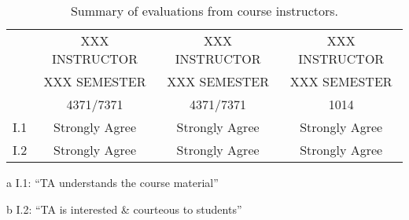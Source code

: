\documentclass[letterpaper]{article}
\begin{document}
\begin{table}[htbp]
\centering
\caption{\label{tab:instructors}Summary of evaluations from course instructors.}
\begin{threeparttable}
\begin{tabular}{rccc}
\toprule
& XXX INSTRUCTOR & XXX INSTRUCTOR & XXX INSTRUCTOR \\
& XXX SEMESTER & XXX SEMESTER & XXX SEMESTER \\
& 4371/7371 & 4371/7371 & 1014 \\
\midrule
I.1\tnote{a} & Strongly Agree & Strongly Agree & Strongly Agree \\
I.2\tnote{b} & Strongly Agree & Strongly Agree & Strongly Agree \\
\bottomrule
\end{tabular}
% 
\begin{tablenotes}
 \item[a] I.1: ``TA understands the course material''
 \item[b] I.2: ``TA is interested \& courteous to students''
\end{tablenotes}
\end{threeparttable}
\end{table}
\end{document}

